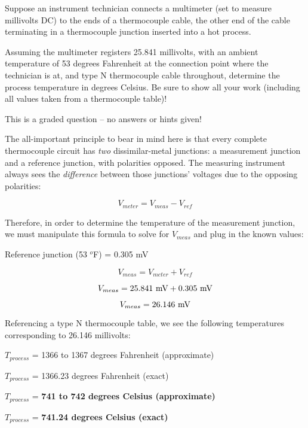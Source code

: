 

Suppose an instrument technician connects a multimeter (set to measure millivolts DC) to the ends of a thermocouple cable, the other end of the cable terminating in a thermocouple junction inserted into a hot process.

\vskip 10pt

Assuming the multimeter registers 25.841 millivolts, with an ambient temperature of 53 degrees Fahrenheit at the connection point where the technician is at, and type N thermocouple cable throughout, determine the process temperature in degrees Celsius.  Be sure to show all your work (including all values taken from a thermocouple table)!


\vfil 

\eject






This is a graded question -- no answers or hints given!







The all-important principle to bear in mind here is that every complete thermocouple circuit has {\it two} dissimilar-metal junctions: a measurement junction and a reference junction, with polarities opposed.  The measuring instrument always sees the {\it difference} between those junctions' voltages due to the opposing polarities:

$$V_{meter} = V_{meas} - V_{ref}$$

Therefore, in order to determine the temperature of the measurement junction, we must manipulate this formula to solve for $V_{meas}$ and plug in the known values:

\vskip 10pt

Reference junction (53 $^{o}$F) = 0.305 mV

$$V_{meas} = V_{meter} + V_{ref}$$

$$V_{meas} = 25.841 \hbox{ mV} + 0.305 \hbox{ mV}$$

$$V_{meas} = 26.146 \hbox{ mV}$$

Referencing a type N thermocouple table, we see the following temperatures corresponding to 26.146 millivolts:

\vskip 10pt

$T_{process}$ = 1366 to 1367 degrees Fahrenheit (approximate)

$T_{process}$ = 1366.23 degrees Fahrenheit (exact)

\vskip 10pt

$T_{process}$ = {\bf 741 to 742 degrees Celsius (approximate)}

$T_{process}$ = {\bf 741.24 degrees Celsius (exact)}




